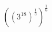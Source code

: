 \documentclass[preview]{standalone}
\begin{document}
\begin{align*}
\left(\left(3^{18} \right)^\frac{1}{3} \right)^\frac{1}{6}\\
\end{align*}
\end{document}
